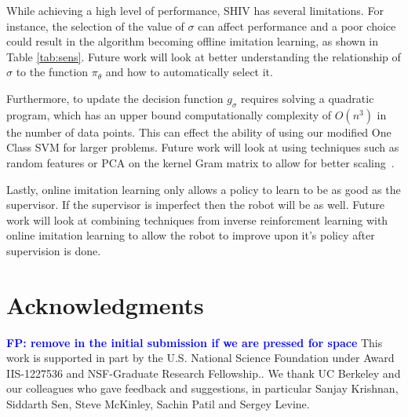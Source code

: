 \documentclass[10pt, conference]{ieeeconf}      %
\newcommand{\fpnote}[1]{\ifthenelse{ \boolean{include-notes}}%
 {\textcolor{blue}{\textbf{FP: #1}}}{}}
\begin{document}
While achieving a high level of performance, SHIV has several limitations. For instance, the selection of the value of $\sigma$ can affect performance and a poor choice could result in the algorithm becoming offline imitation learning, as shown in Table \ref{tab:sens}. Future work will look at better understanding the relationship of $\sigma$ to the function $\pi_{\theta}$ and how to automatically select it. 

 Furthermore, to update the decision function $g_{\sigma}$ requires solving a quadratic program, which has an upper bound computationally complexity of $O(n^3)$ in the number of data points. This can effect the ability of using our modified One Class SVM for larger problems. Future work will look at using techniques such as random features or PCA on the kernel Gram matrix to allow for better scaling~\cite{scholkopf2002learning}.
 
 Lastly, online imitation learning only allows a policy to learn to be as good as the supervisor. If the supervisor is imperfect then the robot will be as well. Future work will look at combining techniques from inverse reinforcment learning\cite{argall2009survey} with online imitation learning to allow the robot to improve upon it's policy after supervision is done. 
 

\section{Acknowledgments} 
\fpnote{remove in the initial submission if we are pressed for space}
This work is supported in part by the U.S. National Science Foundation under Award IIS-1227536 and NSF-Graduate Research Fellowship.. 
We thank UC Berkeley and our colleagues who gave feedback and suggestions, in particular Sanjay Krishnan, Siddarth Sen, Steve McKinley, Sachin Patil and Sergey Levine.






\end{document}
